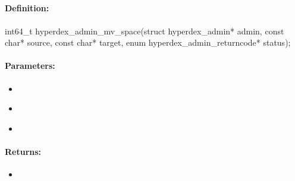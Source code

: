 \pagebreak
\subsection{}
\label{api:c:mv_space}


\paragraph{Definition:}
\begin{ccode}
int64_t hyperdex_admin_mv_space(struct hyperdex_admin* admin,
        const char* source,
        const char* target,
        enum hyperdex_admin_returncode* status);
\end{ccode}

\paragraph{Parameters:}
\begin{itemize}[noitemsep]
\item {}\\

\item {}\\

\item {}\\

\end{itemize}

\paragraph{Returns:}
\begin{itemize}[noitemsep]
\item {}\\

\end{itemize}

\pagebreak
\subsection{}
\label{api:c:list_spaces}


